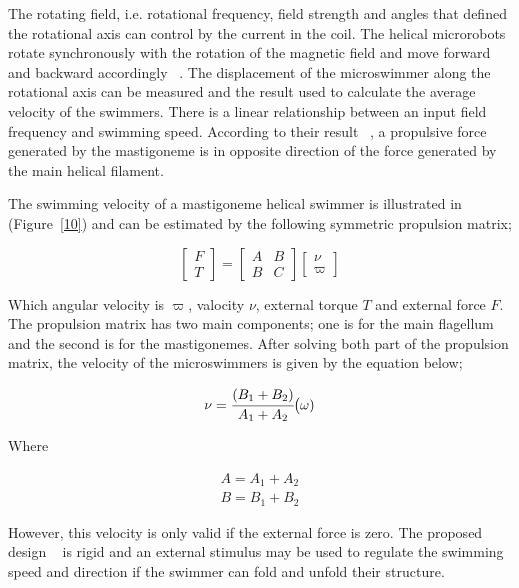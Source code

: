 \documentclass[a4paper,11pt]{article}
\begin{document}
\begin{sloppypar}
 The rotating field, i.e. rotational frequency, field strength and angles that 
defined the rotational axis can control by the current in the coil. The helical microrobots rotate 
synchronously with the rotation of the magnetic field and move forward and backward accordingly ~\citep{tottori2013artificial}. 
The displacement of the microswimmer along the rotational axis can be measured and the result 
used to calculate the average velocity of the swimmers. There is a linear relationship between an input 
field frequency and swimming speed. According to their result ~\citep{tottori2013artificial}, a propulsive force generated by 
the mastigoneme is in opposite direction of the force generated by the main helical filament. 


The swimming velocity of a mastigoneme helical swimmer is illustrated in  (Figure~\ref{10}) and can be estimated by the following
 symmetric propulsion matrix;


\[
\begin{bmatrix} F\\ 
T \end{bmatrix}  =\begin{bmatrix} A & B \\ 
B & C \end{bmatrix}  \begin{bmatrix} \nu
 \\ \varpi
\end{bmatrix}
\]

Which angular velocity is $\varpi$, valocity $\nu$, external torque $T$ and external force $F$.
The propulsion matrix has two main components; one is for the main flagellum and the second is for the mastigonemes. 
After solving both part of the propulsion matrix,
 the velocity of the microswimmers is given by the equation below;


\begin{equation}
  \nu = {\cfrac{(B_1 + B_2)}{A_1+A_2}} \big( \omega)
\end{equation} 

Where

\begin{equation}
\begin{split}
  A = A_1+A_2 \\
 B= B_1+B_2
\end{split}
\end{equation} 

However, this velocity is only valid if the external force is zero. The proposed 
design ~\citep{tottori2013artificial} is rigid and an external stimulus may be used to regulate the swimming
 speed and direction if the swimmer can fold and unfold their structure. 




\end{sloppypar}
\end{document}
